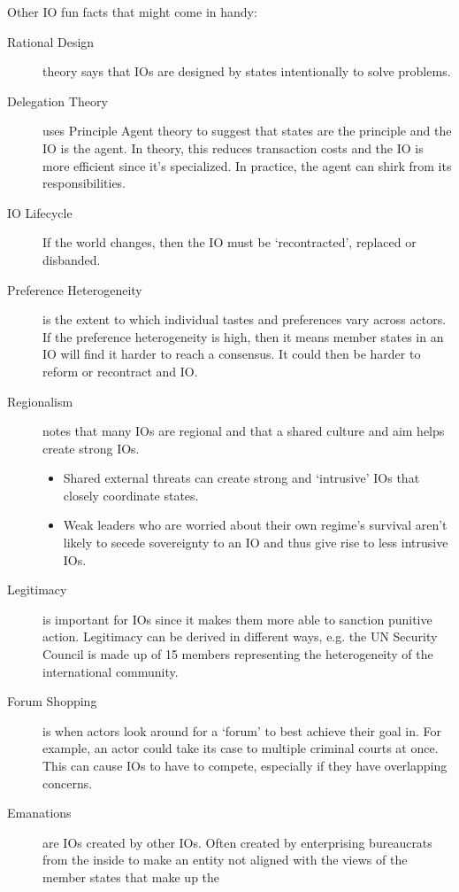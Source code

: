 Other IO fun facts that might come in handy:

\begin{description}
  \item[Rational Design] theory says that IOs are designed by states
    intentionally to solve problems.
  \item[Delegation Theory] uses Principle Agent theory to suggest that
    states are the principle and the IO is the agent. In theory, this
    reduces transaction costs and the IO is more efficient since it's
    specialized. In practice, the agent can shirk from its
    responsibilities.
  \item[IO Lifecycle] If the world changes, then the IO must be
    `recontracted', replaced or disbanded.
  \item[Preference Heterogeneity] is the extent to which individual
    tastes and preferences vary across actors. If the preference
    heterogeneity is high, then it means member states in an IO will
    find it harder to reach a consensus. It could then be harder to
    reform or recontract and IO.
  \item[Regionalism] notes that many IOs are regional and that a
    shared culture and aim helps create strong IOs.
    \begin{itemize}
      \item Shared external threats can create strong and `intrusive'
        IOs that closely coordinate states.
      \item Weak leaders who are worried about their own regime's
        survival aren't likely to secede sovereignty to an IO and thus
        give rise to less intrusive IOs.
    \end{itemize}
  \item[Legitimacy] is important for IOs since it makes them more able
    to sanction punitive action. Legitimacy can be derived in
    different ways, e.g. the UN Security Council is made up of 15
    members representing the heterogeneity of the international
    community.
  \item[Forum Shopping] is when actors look around for a `forum' to
    best achieve their goal in. For example, an actor could take its
    case to multiple criminal courts at once. This can cause IOs to
    have to compete, especially if they have overlapping concerns.
  \item[Emanations] are IOs created by other IOs. Often created by
    enterprising bureaucrats from the inside to make an entity not
    aligned with the views of the member states that make up the

\end{description}
